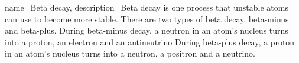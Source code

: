 {
    name=Beta decay,
    description={Beta decay is one process that unstable atoms can use to become more stable. There are two types of beta decay, beta-minus and beta-plus.
During beta-minus decay, a neutron in an atom's nucleus turns into a proton, an electron and an antineutrino
During beta-plus decay, a proton in an atom's nucleus turns into a neutron, a positron and a neutrino.
}
}
